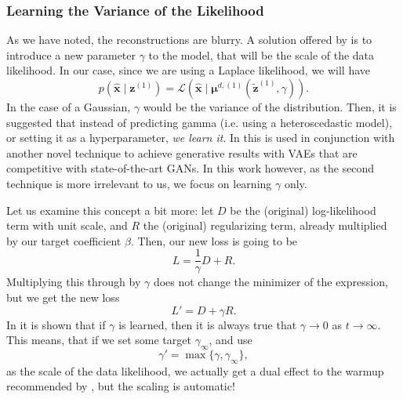 \documentclass{article}
\renewcommand{\vec}[1]{\mathbf{#1}}
\newcommand{\Laplace}[1]{\mathcal{L}\left( #1 \right)}
\newcommand{\MU}{\boldsymbol\mu}
\begin{document}
\subsubsection{Learning the Variance of the Likelihood}
\label{sec:learn_gamma}
\par
As we have noted, the reconstructions are blurry.
A solution offered by \cite{dai2019diagnosing} is to introduce a new parameter
$\gamma$ to the model, that will be the scale of the data likelihood. In our
case, since we are using a Laplace likelihood, we will have
\[
  p(\vec{\hat{x}} \mid \vec{z}^{(1)}) = \Laplace{\vec{\hat{x}} \mid \MU^{d,
      (1)}(\vec{\tilde{z}}^{(1)}, \gamma)}.
\]
In the case of a Gaussian, $\gamma$ would be the variance of the distribution.
Then, it is suggested that instead of predicting gamma (i.e. using a
heteroscedastic model), or setting it as a hyperparameter, \textit{we learn it}.
In \cite{dai2019diagnosing} this is used in conjunction with another novel
technique to achieve generative results with VAEs that are competitive with
state-of-the-art GANs. In this work however, as the second technique is more
irrelevant to us, we focus on learning $\gamma$ only.
\par
Let us examine this concept a bit more: let $D$ be the (original) log-likelihood
term with unit scale, and $R$ the (original) regularizing term, already
multiplied by our target coefficient $\beta$. Then, our new loss is going to be
\[
  L = \frac{1}{\gamma}D + R.
\]
Multiplying this through by $\gamma$ does not change the minimizer of the
expression, but we get the new loss
\[
  L' = D + \gamma R.
\]
In \cite{dai2019diagnosing} it is shown that if $\gamma$ is learned, then it is
always true that $\gamma \rightarrow 0$ as $t \rightarrow \infty$. This means,
that if we set some target $\gamma_\infty$, and use
\[
  \gamma' = \max\{ \gamma, \gamma_\infty \},
\]
as the scale of the data likelihood, we actually get a dual effect to the warmup
recommended by \cite{sonderby2016train}, but the scaling is automatic!
\end{document}

